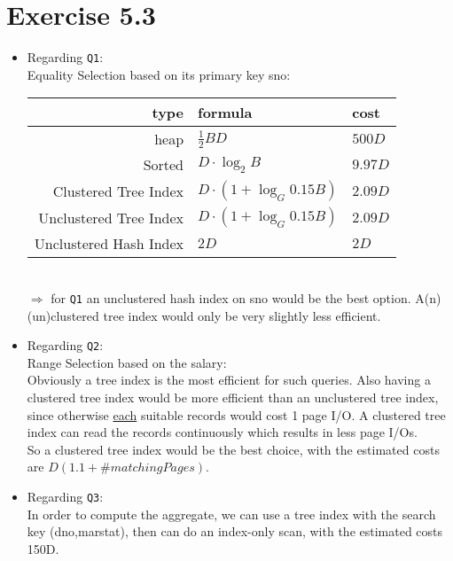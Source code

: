 \documentclass[12pt]{article}
\begin{document}
	\section*{Exercise 5.3}
		\begin{itemize}
			\item Regarding \texttt{Q1}: \\
				Equality Selection based on its primary key sno: \\
				\begin{tabular}{r | l | l}
					type & formula & cost \\ \hline
					heap & $\frac{1}{2}BD$ & $500D$ \\
					Sorted & $D\cdot \log_2 B$ & $9.97D$\\
					Clustered Tree Index & $D\cdot (1+ \log_G 0.15B)$ & $2.09D$ \\
					Unclustered Tree Index & $D\cdot (1+ \log_G 0.15B)$ & $2.09D$\\
					Unclustered Hash Index & $2D$ & $2D$ \\
				\end{tabular}\\
				$\Rightarrow$ for \texttt{Q1} an unclustered hash index on sno would be the best option. A(n) (un)clustered tree index would only be very slightly less efficient.
			\item Regarding \texttt{Q2}: \\
				Range Selection based on the salary:\\
				Obviously a tree index is the most efficient for such queries. Also having a clustered tree index would be more efficient than an unclustered tree index, since otherwise \underline{each} suitable records would cost 1 page I/O. A clustered tree index can read the records continuously which results in less page I/Os.\\
				So a clustered tree index would be the best choice, with the estimated costs are $D(1.1+\#matchingPages)$. 
			\item Regarding \texttt{Q3}: \\
			 In order to compute the aggregate, we can use a tree index with the search key (dno,marstat), then can do an index-only scan, with the estimated costs 150D.
		\end{itemize}
\end{document}
